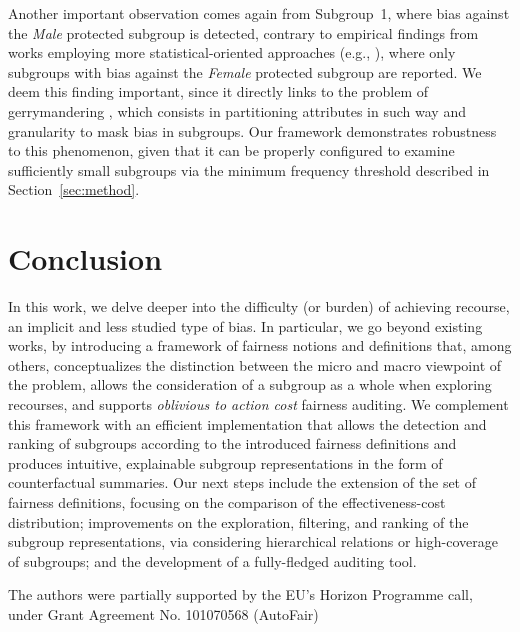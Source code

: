 \documentclass{article}
\begin{document}
  
Another important observation comes again from Subgroup~1, where bias against the \textit{Male} protected subgroup is detected, contrary to empirical findings from works employing more statistical-oriented approaches (e.g., \cite{tramer2017fairtest}), where only subgroups with bias against the \textit{Female} protected subgroup are reported. We deem this finding important, since it directly links to the problem of gerrymandering \cite{kearns2018preventing}, which consists in partitioning attributes in such way and granularity to mask bias in subgroups. Our framework demonstrates robustness to this phenomenon, given that it can be properly configured to examine sufficiently small subgroups via the minimum frequency threshold described in Section~\ref{sec:method}.





% 


\section{Conclusion}\label{conclusion}
In this work, we delve deeper into the difficulty (or burden) of achieving recourse, an implicit and less studied type of bias. In particular, we go beyond existing works, by introducing a framework of fairness notions and definitions that, among others, conceptualizes the distinction between the micro and macro viewpoint of the problem, allows the consideration of a subgroup as a whole when exploring recourses, and supports \textit{oblivious to action cost} fairness auditing. We complement this framework with an efficient implementation that allows the detection and ranking of subgroups according to the introduced fairness definitions and produces intuitive, explainable subgroup representations in the form of counterfactual summaries. 
Our next steps include the extension of the set of fairness definitions, focusing on the comparison of the effectiveness-cost distribution; improvements on the exploration, filtering, and ranking of the subgroup representations, via considering hierarchical relations or high-coverage of subgroups; and the development of a fully-fledged auditing tool.


 \begin{ack}The authors were partially supported by the EU’s Horizon Programme call, under Grant Agreement No. 101070568 (AutoFair)\end{ack}
\end{document}
